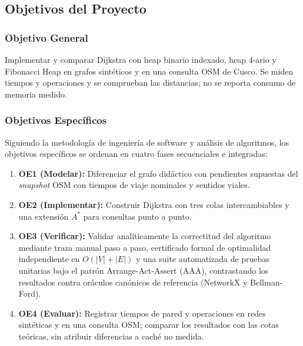\subsection{Objetivos del Proyecto}

\subsubsection{Objetivo General}
Implementar y comparar Dijkstra con heap binario indexado, heap 4-ario y Fibonacci Heap en grafos sintéticos y en una consulta OSM de Cusco. Se miden tiempos y operaciones y se comprueban las distancias; no se reporta consumo de memoria medido.

\subsubsection{Objetivos Específicos}
Siguiendo la metodología de ingeniería de software y análisis de algoritmos, los objetivos específicos se ordenan en cuatro fases secuenciales e integradas:
\begin{enumerate}
    \item \textbf{OE1 (Modelar):} Diferenciar el grafo didáctico con pendientes supuestas del \textit{snapshot} OSM con tiempos de viaje nominales y sentidos viales.
    \item \textbf{OE2 (Implementar):} Construir Dijkstra con tres colas intercambiables y una extensión $A^*$ para consultas punto a punto.
    \item \textbf{OE3 (Verificar):} Validar analíticamente la correctitud del algoritmo mediante traza manual paso a paso, certificado formal de optimalidad independiente en $O(|V|+|E|)$ y una suite automatizada de pruebas unitarias bajo el patrón Arrange-Act-Assert (AAA), contrastando los resultados contra oráculos canónicos de referencia (NetworkX y Bellman-Ford).
    \item \textbf{OE4 (Evaluar):} Registrar tiempos de pared y operaciones en redes sintéticas y en una consulta OSM; comparar los resultados con las cotas teóricas, sin atribuir diferencias a caché no medida.
\end{enumerate}

